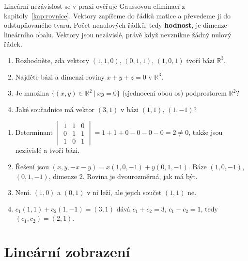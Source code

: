 \begin{note}
  Lineární nezávislost se v praxi ověřuje Gaussovou eliminací z kapitoly~\ref{kap:rovnice}. Vektory zapíšeme do řádků matice a převedeme ji do odstupňovaného tvaru. Počet nenulových řádků, tedy \textbf{hodnost}, je dimenze lineárního obalu. Vektory jsou nezávislé, právě když nevznikne žádný nulový řádek.
\end{note}

\begin{problem}
  \begin{enumerate}[label=(\alph*)]
    \item Rozhodněte, zda vektory $(1, 1, 0)$, $(0, 1, 1)$, $(1, 0, 1)$ tvoří bázi $\mathbb{R}^3$.
    \item Najděte bázi a dimenzi roviny $x + y + z = 0$ v $\mathbb{R}^3$.
    \item Je množina $\{(x, y)\in\mathbb{R}^2\ |\ xy = 0\}$ (sjednocení obou os) podprostorem $\mathbb{R}^2$?
    \item Jaké souřadnice má vektor $(3, 1)$ v bázi $(1, 1)$, $(1, -1)$?
  \end{enumerate}
\end{problem}

\begin{solution}
  \begin{enumerate}[label=(\alph*)]
    \item Determinant $\begin{vmatrix} 1 & 1 & 0\\ 0 & 1 & 1\\ 1 & 0 & 1\end{vmatrix} = 1 + 1 + 0 - 0 - 0 - 0 = 2\neq 0$, takže jsou nezávislé a tvoří bázi.
    \item Řešení jsou $(x, y, -x - y) = x(1, 0, -1) + y(0, 1, -1)$. Báze $(1, 0, -1)$, $(0, 1, -1)$, dimenze $2$. Rovina je dvourozměrná, jak má být.
    \item Není. $(1, 0)$ a $(0, 1)$ v ní leží, ale jejich součet $(1, 1)$ ne.
    \item $c_1(1, 1) + c_2(1, -1) = (3, 1)$ dává $c_1 + c_2 = 3$, $c_1 - c_2 = 1$, tedy $(c_1, c_2) = (2, 1)$.
  \end{enumerate}
\end{solution}

\section{Lineární zobrazení}

